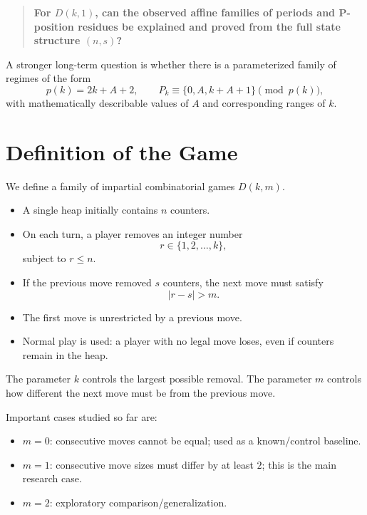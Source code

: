 \documentclass[11pt]{article}
\begin{document}
\begin{quote}
\textbf{For $D(k,1)$, can the observed affine families of periods and P-position residues be explained and proved from the full state structure $(n,s)$?}
\end{quote}

A stronger long-term question is whether there is a parameterized family of regimes of the form
\begin{equation}
    p(k)=2k+A+2,
    \qquad
    P_k\equiv\{0,A,k+A+1\}\pmod{p(k)},
\end{equation}
with mathematically describable values of $A$ and corresponding ranges of $k$.

\section{Definition of the Game}

We define a family of impartial combinatorial games $D(k,m)$.

\begin{itemize}
    \item A single heap initially contains $n$ counters.
    \item On each turn, a player removes an integer number
    \[
        r\in\{1,2,\ldots,k\},
    \]
    subject to $r\le n$.
    \item If the previous move removed $s$ counters, the next move must satisfy
    \[
        |r-s|>m.
    \]
    \item The first move is unrestricted by a previous move.
    \item Normal play is used: a player with no legal move loses, even if counters remain in the heap.
\end{itemize}

The parameter $k$ controls the largest possible removal. The parameter $m$ controls how different the next move must be from the previous move.

Important cases studied so far are:
\begin{itemize}
    \item $m=0$: consecutive moves cannot be equal; used as a known/control baseline.
    \item $m=1$: consecutive move sizes must differ by at least $2$; this is the main research case.
    \item $m=2$: exploratory comparison/generalization.
\end{itemize}
\end{document}

